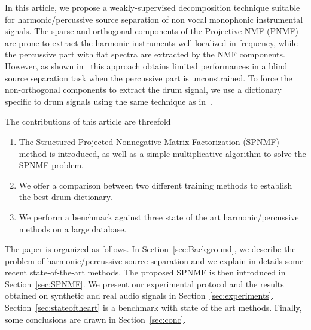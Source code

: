 


In this article, we propose a weakly-supervised decomposition technique suitable for harmonic/percussive source separation of non vocal monophonic instrumental signals. The sparse and orthogonal components of the Projective NMF (PNMF) are prone to extract the harmonic instruments well localized in frequency, while the percussive part with flat spectra are extracted by the NMF components. However, as shown in~\cite{laroche2015structured} this approach obtains limited performances in a blind source separation task when the percussive part is unconstrained. To force the non-orthogonal components to extract the drum signal, we use a dictionary specific to drum signals using the same technique as in~\cite{wudrum}.

The contributions of this article are threefold
\begin{enumerate}
\item The Structured Projected Nonnegative Matrix Factorization (SPNMF) method is introduced, as well as a simple multiplicative algorithm to solve the SPNMF problem.
\item  We offer a comparison between two different training methods to establish the best drum dictionary.
\item We perform a benchmark against three state of the art harmonic/percussive methods on a large database.	
\end{enumerate}


The paper is organized as follows. In Section~\ref{sec:Background}, we describe the problem of harmonic/percussive source separation and we explain in details some recent state-of-the-art methods. The proposed SPNMF is then introduced in Section~\ref{sec:SPNMF}. We present our experimental protocol and the results obtained on synthetic and real audio signals in Section~\ref{sec:experiments}. Section~\ref{sec:stateoftheart} is a benchmark with state of the art methods. Finally, some conclusions are drawn in Section~\ref{sec:conc}.


